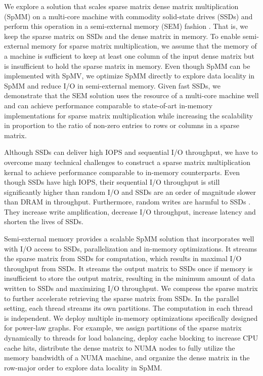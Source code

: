 We explore a solution that scales sparse matrix dense matrix multiplication
(SpMM) on a multi-core machine with commodity solid-state drives (SSDs) and
perform this operation in a semi-external memory (SEM) fashion
\cite{flashgraph, Abello98}. That is, we keep the sparse matrix on SSDs and
the dense matrix in memory. 
To enable semi-external memory for sparse matrix multiplication, we assume
that the memory of a machine is sufficient to keep at least one column
of the input dense matrix but is insufficient to hold the sparse matrix
in memory. Even though SpMM can be implemented with SpMV,
we optimize SpMM directly to explore data locality in SpMM and reduce I/O
in semi-external memory. Given fast SSDs, we demonstrate that the SEM solution
uses the resource of a multi-core machine well and
can achieve performance comparable to state-of-art in-memory implementations
for sparse matrix multiplication while increasing the scalability in proportion
to the ratio of non-zero entries to rows or columns in a sparse matrix.


Although SSDs can deliver high IOPS and sequential I/O throughput, we have
to overcome many technical challenges to construct a sparse matrix
multiplication kernal to achieve performance comparable to in-memory
counterparts. Even though SSDs have high IOPS, their sequential I/O throughput
is still significantly higher than random I/O and SSDs are an order of
magnitude slower than DRAM in throughput. Furthermore, random writes are harmful
to SSDs \cite{sfs}. They increase write amplification, decrease I/O throughput,
increase latency and shorten the lives of SSDs.

Semi-external memory provides a scalable SpMM solution that incorporates well
with I/O access to SSDs, parallelization and in-memory optimizations.
It streams the sparse matrix from SSDs for computation, which results in maximal
I/O throughput from SSDs. It streams the output matrix to SSDs once if
memory is insufficient to store the output matrix, resulting in
the minimum amount of data written to SSDs and maximizing I/O throughput.
We compress the sparse matrix to further accelerate retrieving the sparse
matrix from SSDs. In the parallel setting, each thread streams its own partitions.
The computation in each thread is independent.
We deploy multiple in-memory optimizations specifically designed for power-law
graphs. For example, we assign partitions of the sparse matrix dynamically to
threads for load balancing, deploy cache blocking to increase CPU cache hits,
distribute the dense matrix to NUMA nodes to fully utilize the memory
bandwidth of a NUMA machine, and organize the dense matrix in the row-major order
to explore data locality in SpMM.

